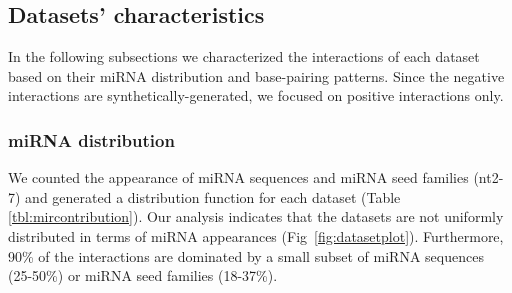 \documentclass{bmcart}
\begin{document}
\subsection*{Datasets' characteristics}
In the following subsections we characterized the interactions of each dataset based on their miRNA distribution and base-pairing patterns. Since the negative interactions are synthetically-generated, we focused on positive interactions only.

\subsubsection*{miRNA distribution}
We counted the appearance of miRNA sequences and miRNA seed families (nt2-7) and generated a distribution function for each dataset (Table \ref{tbl:mircontribution}). Our analysis indicates that the datasets are not uniformly distributed in terms of miRNA appearances (Fig~\ref{fig:datasetplot}). Furthermore, 90\% of the interactions are dominated by a small subset of miRNA sequences (25-50\%) or miRNA seed families (18-37\%).
\end{document}

